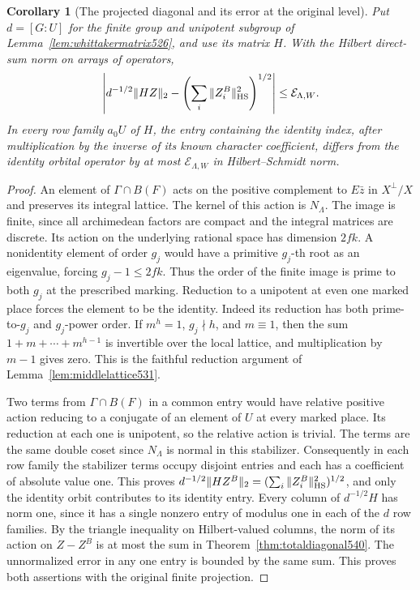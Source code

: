 \documentclass[a4paper,11pt]{article}
\newtheorem{corollary}[proposition]{Corollary}
\theoremstyle{definition}
\theoremstyle{remark}
\numberwithin{equation}{section}
\begin{document}
\begin{corollary}[The projected diagonal and its error at the original level]
\leavevmode\label{cor:projecteddiagonal540}
Put \(d=[G:U]\) for the finite group and unipotent subgroup of
Lemma~\ref{lem:whittakermatrix526}, and use its matrix \(H\).
With the Hilbert direct-sum norm on arrays of operators,
\[
 \left| d^{-1/2}\|HZ\|_2-
             \left(\sum_i\|Z_i^B\|_{\rm HS}^2\right)^{1/2}\right|
                    \le\mathcal E_{\Lambda,W}.
\]
In every row family \(a_0U\) of \(H\), the entry containing the
identity index, after multiplication by the inverse of its known
character coefficient, differs from the identity orbital operator
by at most \(\mathcal E_{\Lambda,W}\) in Hilbert--Schmidt norm.
\end{corollary}
\begin{proof}
An element of \(\Gamma\cap B(F)\) acts on the positive
complement to \(E\bar z\) in \(X^\perp/X\) and preserves its
integral lattice. The kernel of this action is \(N_\Lambda\).
The image is finite, since all archimedean factors are compact
and the integral matrices are discrete. Its action on the
underlying rational space has dimension \(2fk\). A nonidentity
element of order \(g_j\) would have a primitive \(g_j\)-th root
as an eigenvalue, forcing \(g_j-1\le2fk\). Thus the order of
the finite image is prime to both \(g_j\) at the prescribed
marking. Reduction to a unipotent at even one marked place
forces the element to be the identity. Indeed its reduction has
both prime-to-\(g_j\) and \(g_j\)-power order. If \(m^h=1\),
\(g_j\nmid h\), and \(m\equiv1\), then the sum
\(1+m+\cdots+m^{h-1}\) is invertible over the local lattice,
and multiplication by \(m-1\) gives zero. This is the
faithful reduction argument of Lemma~\ref{lem:middlelattice531}.

Two terms from \(\Gamma\cap B(F)\) in a common entry would
have relative positive action reducing to a conjugate of an
element of \(U\) at every marked place. Its reduction at each
one is unipotent, so the relative action is trivial. The terms
are the same double coset since \(N_\Lambda\) is normal in this
stabilizer. Consequently in each row family the stabilizer terms
occupy disjoint entries and each has a coefficient of absolute
value one. This proves
\(d^{-1/2}\|HZ^B\|_2=(\sum_i\|Z_i^B\|_{\rm HS}^2)^{1/2}\),
and only the identity orbit contributes to its identity entry.
Every column of \(d^{-1/2}H\) has norm one, since it has a
single nonzero entry of modulus one in each of the \(d\) row
families. By the triangle inequality on Hilbert-valued columns,
the norm of its action on \(Z-Z^B\) is at most the sum in
Theorem~\ref{thm:totaldiagonal540}. The unnormalized error in
any one entry is bounded by the same sum. This proves both
assertions with the original finite projection.
\end{proof}
\end{document}
